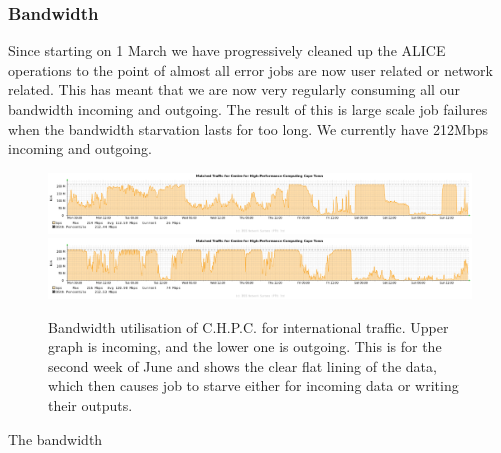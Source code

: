 \documentclass[a4paper]{jpconf}
\begin{document}
\subsubsection{Bandwidth}
Since starting on 1 March we have progressively cleaned up the ALICE operations to the point of almost
all error jobs are now user related or network related. This has meant that we are now very regularly consuming all our
bandwidth incoming and outgoing. The result of this is large scale job failures when the bandwidth starvation lasts for too long.
We currently have 212Mbps incoming and outgoing. 
\begin{figure}
\begin{center}
  \includegraphics[width=38pc]{wacsinmidjun.eps}
  \includegraphics[width=38pc]{seacomoutmidjun.eps}
\end{center}
\caption{\label{label}Bandwidth utilisation of C.H.P.C. for international traffic. Upper graph is incoming, and the lower one is outgoing. This is for the second week of June and shows the clear flat lining of the data, which then causes job to starve either for incoming data or writing their outputs.}
\end{figure}
The bandwidth 



\end{document}
